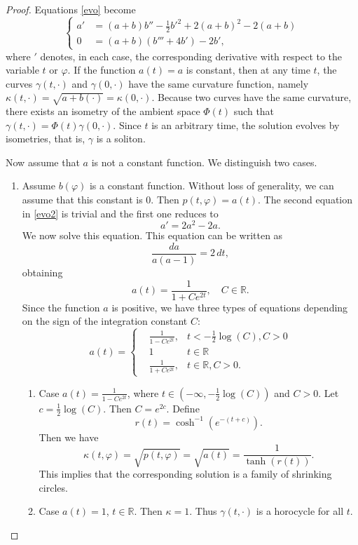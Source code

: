 \documentclass[12pt]{amsart}
\theoremstyle{plain}
\theoremstyle{definition}
\def\r{\mathbb R}
\begin{document}
\begin{proof}
Equations \eqref{evo} become
\begin{equation}\label{evo2}
\left\{
\begin{split}
a' &= (a+b)b'' - \frac{1}{2}b'^2 + 2(a+b)^2 - 2(a+b) \\
0&= (a+b)(b'''+4b')-2b',
\end{split}\right.
\end{equation}
where $'$ denotes, in each case, the corresponding derivative with respect to the variable $t$ or $\varphi$. 
 If the function $a(t)=a$ is constant, then at any time $t$, the curves $\gamma(t, \cdot)$ and $\gamma(0, \cdot)$ have the same curvature function, namely $\kappa(t, \cdot) = \sqrt{a + b(\cdot)} = \kappa(0, \cdot)$. 
Because two curves have the same curvature, there exists an isometry of the ambient space $\Phi(t)$ such that $\gamma(t, \cdot) = \Phi(t)\gamma(0, \cdot)$. Since $t$ is an arbitrary time, the solution evolves by isometries,  that is, $\gamma$ is a soliton.  
 
Now assume that $a$ is not a constant function. We distinguish two cases.
\begin{enumerate}
\item Assume   $b(\varphi) $ is a constant function. Without loss of generality, we can assume that this constant is $0$. Then $p(t, \varphi) = a(t)$.  The second equation in \eqref{evo2} is trivial and the first one   reduces to  
$$a' = 2a^2 - 2a.$$ 
We now solve this equation. This equation can be written as
$$\frac{da}{a(a-1)}=2\, dt,$$
obtaining
$$a(t)=\frac{1}{1+C e^{2t}},\quad C\in\r.$$
Since the function $a$ is positive, we have three types of equations depending on the sign of the integration constant $C$:
\begin{equation}\label{a3}
a(t) = \left\{\begin{array}{lll} 
 &\frac{1}{1-Ce^{2t}},  & t<-\frac12\log(C), C>0\\ 
  & 1 &t\in\r\\
  &\frac{1}{1+Ce^{2t}},&t\in\r,  C>0.
  \end{array}\right.
\end{equation}
\begin{enumerate}
\item Case $a(t) =  \frac{1}{1-Ce^{2t}}$, where $t\in (-\infty,-\frac12\log(C))$ and $C>0$. Let $c=\frac12\log(C)$. Then $C=e^{2c}$. Define
$$r(t)=\cosh^{-1}(e^{-(t+c)}).$$
 Then we have 
$$\kappa(t, \varphi) = \sqrt{p(t, \varphi)} = \sqrt{a(t)} = \frac{1}{\tanh(r(t))}.$$ 
This implies that the  corresponding solution is a  family of shrinking circles.  
 \item Case  $a(t)=1$, $t\in\r$. Then $\kappa=1$. Thus $\gamma(t,\cdot)$ is a horocycle for all $t$. 


\end{enumerate}
\end{enumerate}
\end{proof}
\end{document}
